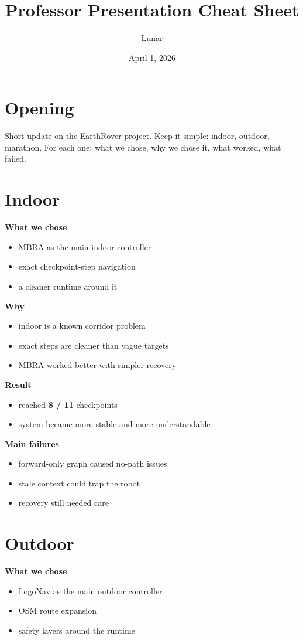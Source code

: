 \documentclass[11pt]{article}
\title{Professor Presentation Cheat Sheet}
\author{Lunar}
\date{April 1, 2026}
\begin{document}
\maketitle
\thispagestyle{empty}

\section*{Opening}
Short update on the EarthRover project. Keep it simple: indoor, outdoor, marathon. For each one: what we chose, why we chose it, what worked, what failed.

\section*{Indoor}
\textbf{What we chose}
\begin{itemize}[leftmargin=*]
\item MBRA as the main indoor controller
\item exact checkpoint-step navigation
\item a cleaner runtime around it
\end{itemize}

\textbf{Why}
\begin{itemize}[leftmargin=*]
\item indoor is a known corridor problem
\item exact steps are cleaner than vague targets
\item MBRA worked better with simpler recovery
\end{itemize}

\textbf{Result}
\begin{itemize}[leftmargin=*]
\item reached \textbf{8 / 11} checkpoints
\item system became more stable and more understandable
\end{itemize}

\textbf{Main failures}
\begin{itemize}[leftmargin=*]
\item forward-only graph caused no-path issues
\item stale context could trap the robot
\item recovery still needed care
\end{itemize}

\section*{Outdoor}
\textbf{What we chose}
\begin{itemize}[leftmargin=*]
\item LogoNav as the main outdoor controller
\item OSM route expansion
\item safety layers around the runtime
\end{itemize}
\end{document}

